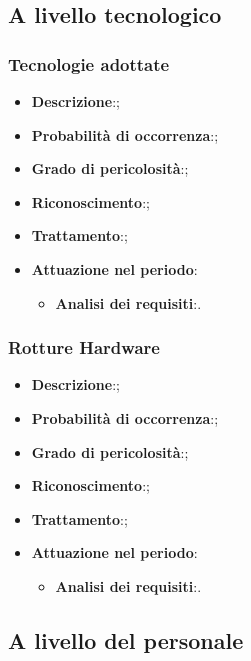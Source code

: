 	\subsection{A livello tecnologico}
	
		\subsubsection{Tecnologie adottate}
		\begin{itemize}
			\item \textbf{Descrizione}:;
			\item \textbf{Probabilità di occorrenza}:;
			\item \textbf{Grado di pericolosità}:;
			\item \textbf{Riconoscimento}:;	
			\item \textbf{Trattamento}:;
			\item \textbf{Attuazione nel periodo}:
				\begin{itemize}
					\item \textbf{Analisi dei requisiti}:.
				\end{itemize}
		\end{itemize}
		
		\subsubsection{Rotture Hardware}
		\begin{itemize}
			\item \textbf{Descrizione}:;
			\item \textbf{Probabilità di occorrenza}:;
			\item \textbf{Grado di pericolosità}:;
			\item \textbf{Riconoscimento}:;	
			\item \textbf{Trattamento}:;
			\item \textbf{Attuazione nel periodo}:
			\begin{itemize}
				\item \textbf{Analisi dei requisiti}:.
			\end{itemize}
		\end{itemize}	
	
	\subsection{A livello del personale}
	

